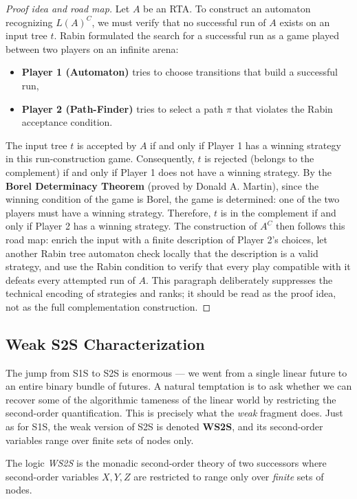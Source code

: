 \begin{proof}[Proof idea and road map]
Let $A$ be an RTA. To construct an automaton recognizing $L(A)^C$, we must verify that no successful run of $A$ exists on an input tree $t$.
Rabin formulated the search for a successful run as a game played between two players on an infinite arena:
\begin{itemize}
    \item \textbf{Player 1 (Automaton)} tries to choose transitions that build a successful run,
    \item \textbf{Player 2 (Path-Finder)} tries to select a path $\pi$ that violates the Rabin acceptance condition.
\end{itemize}
The input tree $t$ is accepted by $A$ if and only if Player 1 has a winning strategy in this run-construction game. Consequently, $t$ is rejected (belongs to the complement) if and only if Player 1 does not have a winning strategy.
By the \textbf{Borel Determinacy Theorem} (proved by Donald A. Martin), since the winning condition of the game is Borel, the game is determined: one of the two players must have a winning strategy.
Therefore, $t$ is in the complement if and only if Player 2 has a winning strategy.
The construction of $A^C$ then follows this road map: enrich the input with a finite description of Player 2's choices, let another Rabin tree automaton check locally that the description is a valid strategy, and use the Rabin condition to verify that every play compatible with it defeats every attempted run of $A$. This paragraph deliberately suppresses the technical encoding of strategies and ranks; it should be read as the proof idea, not as the full complementation construction.
\end{proof}

\subsection{Weak S2S Characterization}
The jump from S1S to S2S is enormous --- we went from a single linear future to an entire binary bundle of futures. A natural temptation is to ask whether we can recover some of the algorithmic tameness of the linear world by restricting the second-order quantification. This is precisely what the \emph{weak} fragment does. Just as for S1S, the weak version of S2S is denoted \textbf{WS2S}, and its second-order variables range over finite sets of nodes only.

\begin{definition}
The logic \emph{WS2S} is the monadic second-order theory of two successors where second-order variables $X, Y, Z$ are restricted to range only over \emph{finite} sets of nodes.
\end{definition}

